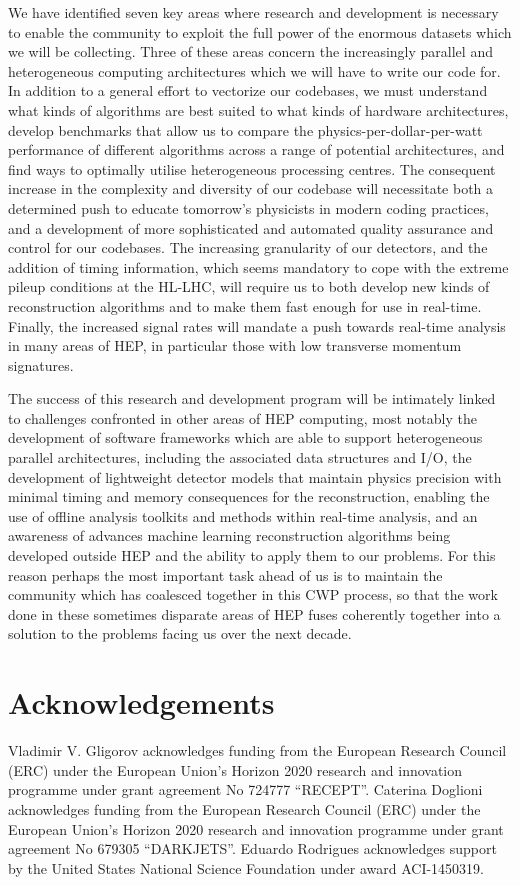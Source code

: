 We have identified seven key areas where research and development is necessary to enable the community to exploit the full power of the enormous datasets which we will be collecting. Three of these 
areas concern the increasingly parallel and heterogeneous computing architectures which we will have to write our code for. In addition to a general effort to vectorize our codebases, we must understand 
what kinds of algorithms are best suited to what kinds of hardware architectures, develop benchmarks that allow us to compare the physics-per-dollar-per-watt performance of different algorithms across a 
range of potential architectures, and find ways to optimally utilise heterogeneous processing centres. The consequent increase in the complexity and diversity of our codebase will necessitate both a 
determined push to educate tomorrow’s physicists in modern coding practices, and a development of more sophisticated and automated quality assurance and control for our codebases. The increasing granularity 
of our detectors, and the addition of timing information, which seems mandatory to cope with the extreme pileup conditions at the HL-LHC, will require us to both develop new kinds of reconstruction algorithms 
and to make them fast enough for use in real-time. Finally, the increased signal rates will mandate a push towards real-time analysis in many areas of HEP, in particular those with low transverse momentum 
signatures.

The success of this research and development program will be intimately linked to challenges confronted in other areas of HEP computing, most notably the development of software frameworks which are able 
to support heterogeneous parallel architectures, including the associated data structures and I/O, the development of lightweight detector models that maintain physics precision with minimal timing and 
memory consequences for the reconstruction, enabling the use of offline analysis toolkits and methods within real-time analysis, and an awareness of advances machine learning reconstruction algorithms 
being developed outside HEP and the ability to apply them to our problems. For this reason perhaps the most important task ahead of us is to maintain the community which has coalesced together in this 
CWP process, so that the work done in these sometimes disparate areas of HEP fuses coherently together into a solution to the problems facing us over the next decade.

\section*{Acknowledgements}
Vladimir V. Gligorov acknowledges funding from the European Research Council (ERC) under the European Union's Horizon 2020 research and innovation programme under grant agreement No 724777 ``RECEPT''. Caterina Doglioni acknowledges funding from the European Research Council (ERC) under the European Union's Horizon 2020 research and innovation programme under grant agreement No 679305  ``DARKJETS''.  Eduardo Rodrigues acknowledges support by the United States National Science Foundation under award ACI-1450319.

 

